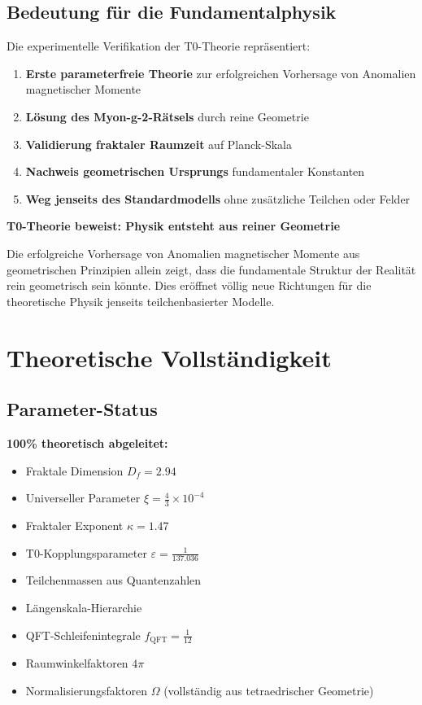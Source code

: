 \documentclass[12pt,a4paper]{article}
\numberwithin{equation}{section}
\newcommand{\xipar}{\xi}
\newcommand{\epsilonT}{\varepsilon}
\newcommand{\fQFT}{f_{\text{QFT}}}
\newcommand{\kappaT}{\kappa}
\newcommand{\Df}{D_f}
\newcommand{\Omegafactor}{\Omega}
\begin{document}
	\subsection{Bedeutung für die Fundamentalphysik}
	
	Die experimentelle Verifikation der T0-Theorie repräsentiert:
	
	\begin{enumerate}
		\item \textbf{Erste parameterfreie Theorie} zur erfolgreichen Vorhersage von Anomalien magnetischer Momente
		\item \textbf{Lösung des Myon-g-2-Rätsels} durch reine Geometrie
		\item \textbf{Validierung fraktaler Raumzeit} auf Planck-Skala
		\item \textbf{Nachweis geometrischen Ursprungs} fundamentaler Konstanten
		\item \textbf{Weg jenseits des Standardmodells} ohne zusätzliche Teilchen oder Felder
	\end{enumerate}
	
	\begin{tcolorbox}[title={\textbf{REVOLUTIONÄRE AUSWIRKUNG}},colframe=purple,colback=purple!5]
		\textbf{T0-Theorie beweist: Physik entsteht aus reiner Geometrie}
		
		Die erfolgreiche Vorhersage von Anomalien magnetischer Momente aus geometrischen Prinzipien allein zeigt, dass die fundamentale Struktur der Realität rein geometrisch sein könnte. Dies eröffnet völlig neue Richtungen für die theoretische Physik jenseits teilchenbasierter Modelle.
	\end{tcolorbox}
	
	\section{Theoretische Vollständigkeit}
	
	\subsection{Parameter-Status}
	
	\textbf{100\% theoretisch abgeleitet:}
	\begin{itemize}
		\item Fraktale Dimension $\Df = 2.94$
		\item Universeller Parameter $\xipar = \frac{4}{3} \times 10^{-4}$
		\item Fraktaler Exponent $\kappaT = 1.47$
		\item T0-Kopplungsparameter $\epsilonT = \frac{1}{137.036}$
		\item Teilchenmassen aus Quantenzahlen
		\item Längenskala-Hierarchie
		\item QFT-Schleifenintegrale $\fQFT = \frac{1}{12}$
		\item Raumwinkelfaktoren $4\pi$
		\item Normalisierungsfaktoren $\Omegafactor$ (vollständig aus tetraedrischer Geometrie)
	\end{itemize}
	
\end{document}
